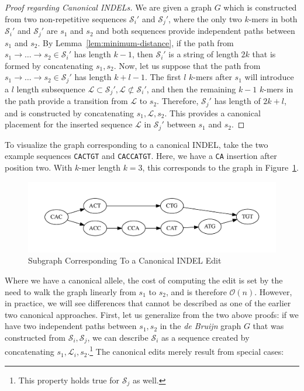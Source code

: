 \documentclass[11pt]{article}
\begin{document}
\begin{proof}[Proof regarding Canonical INDELs]
\label{proof:canonical-indels}
We are given a graph $G$ which is constructed from two non-repetitive sequences $\mathcal{S}_i'$ and
$\mathcal{S}_j'$, where the only two $k$-mers in both $\mathcal{S}_i'$ and $\mathcal{S}_j'$ are $s_1$
and $s_2$ and both sequences provide independent paths between $s_1$ and $s_2$. By
Lemma~\ref{lem:minimum-distance}, if the path from $s_1 \rightarrow \dots \rightarrow s_2 \in
\mathcal{S}_i'$ has length $k - 1$, then $\mathcal{S}_i'$ is a string of length $2k$ that is formed by
concatenating $s_1, s_2$. Now, let us suppose that the path from $s_1 \rightarrow \dots \rightarrow s_2
\in \mathcal{S}_j'$ has length $k + l - 1$. The first $l$ $k$-mers after $s_1$ will introduce a $l$ length
subsequence $\mathcal{L} \subset \mathcal{S}_j', \mathcal{L} \not\subset \mathcal{S}_i'$, and then the
remaining $k - 1$ $k$-mers in the path provide a transition from $\mathcal{L}$ to $s_2$. Therefore,
$\mathcal{S}_j'$ has length of $2k + l$, and is constructed by concatenating $s_1, \mathcal{L}, s_2$.
This provides a canonical placement for the inserted sequence $\mathcal{L}$ in $\mathcal{S}_j'$ between
$s_1$ and $s_2$.
\end{proof}

To visualize the graph corresponding to a canonical INDEL, take the two example sequences
\texttt{CACTGT} and \texttt{CACCATGT}. Here, we have a \texttt{CA} insertion after position two. With
$k$-mer length $k = 3$, this corresponds to the graph in Figure~\ref{fig:indel}.

\begin{figure}[h]
\begin{center}
\includegraphics[width=0.5\linewidth, clip=true, trim=0 39 0 39]{graphs/indel.pdf}
\end{center}
\caption{Subgraph Corresponding To a Canonical INDEL Edit}
\label{fig:indel}
\end{figure}

Where we have a canonical allele, the cost of computing the edit is set by the need to walk the graph
linearly from $s_1$ to $s_2$, and is therefore $\mathcal{O}(n)$. However, in practice, we will see
differences that cannot be described as one of the earlier two canonical approaches. First, let us
generalize from the two above proofs: if we have two independent paths between $s_1, s_2$ in the
\emph{de Bruijn} graph $G$ that was constructed from $\mathcal{S}_i, \mathcal{S}_j$, we can describe
$\mathcal{S}_i$ as a sequence created by concatenating $s_1, \mathcal{L}_i, s_2$.\footnote{This
property holds true for $\mathcal{S}_j$ as well.} The canonical edits merely result from special cases:
\end{document}
